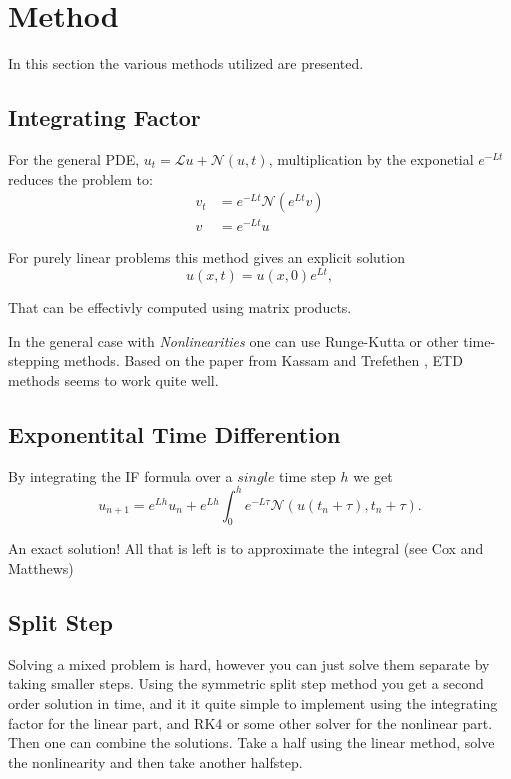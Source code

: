 \section{Method}
In this section the various methods utilized are presented. 

\subsection{Integrating Factor}

For the general PDE, $u_t = \mathcal{L}u + \mathcal{N}\left(u,t\right)$, multiplication by the exponetial $ e^{-Lt} $ reduces the problem to:
\begin{align*}
    v_t &= e^{-Lt}\mathcal{N}\left(e^{Lt}v\right) \\
    v   &= e^{-Lt}u
\end{align*}

For purely linear problems this method gives an explicit solution
\begin{equation}
    u\left(x,t\right) = u\left(x,0\right)e^{Lt},
\end{equation}

That can be effectivly computed using matrix products. 

In the general case with \textit{Nonlinearities} one can use Runge-Kutta or other time-stepping methods.
Based on the paper from Kassam and Trefethen \cite{ETD}, ETD methods seems to work quite well. 

\subsection{Exponentital Time Differention}
By integrating the IF formula over a $single$ time step $h$ we get
\begin{equation}
    u_{n+1} = e^{Lh}u_n + e^{Lh} \int_{0}^h e^{-L\tau} \mathcal{N}\left( u(t_n + \tau), t_n + \tau \right).
\end{equation}

An exact solution! All that is left is to approximate the integral (see Cox and Matthews)

\subsection{Split Step}
Solving a mixed problem is hard, however you can just solve them separate by taking smaller steps. Using the symmetric split step method you get a second order solution in time, 
and it it quite simple to implement using the integrating factor for the linear part, and RK4 or some other solver for the nonlinear part. 
Then one can combine the solutions. Take a half using the linear method, solve the nonlinearity and then take another halfstep. 